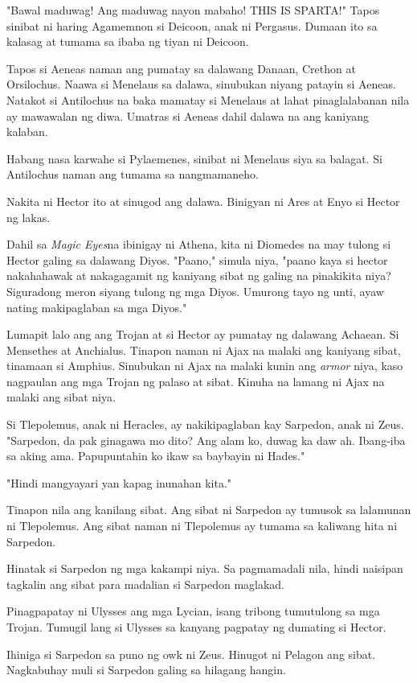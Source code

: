 \documentclass[12pt,letterpaper]{report}
\begin{document}
"Bawal maduwag! Ang maduwag nayon mabaho! THIS IS SPARTA!" Tapos sinibat ni haring Agamemnon si Deicoon, anak ni Pergasus. Dumaan ito sa kalasag at tumama sa ibaba ng tiyan ni Deicoon.

Tapos si Aeneas naman ang pumatay sa dalawang Danaan, Crethon at Orsilochus. Naawa si Menelaus sa dalawa, sinubukan niyang patayin si Aeneas. Natakot si Antilochus na baka mamatay si Menelaus at lahat pinaglalabanan nila ay mawawalan ng diwa. Umatras si Aeneas dahil dalawa na ang kaniyang kalaban.

Habang nasa karwahe si Pylaemenes, sinibat ni Menelaus siya sa balagat. Si Antilochus naman ang tumama sa nangmamaneho.

Nakita ni Hector ito at sinugod ang dalawa. Binigyan ni Ares at Enyo si Hector ng lakas.

Dahil sa \textit{Magic Eyes}\texttrademark na ibinigay ni Athena, kita ni Diomedes na may tulong si Hector galing sa dalawang Diyos. "Paano," simula niya, "paano kaya si hector nakahahawak at nakagagamit ng kaniyang sibat ng galing na pinakikita niya? Siguradong meron siyang tulong ng mga Diyos. Umurong tayo ng unti, ayaw nating makipaglaban sa mga Diyos."

Lumapit lalo ang ang Trojan at si Hector ay pumatay ng dalawang Achaean. Si Mensethes at Anchialus. Tinapon naman ni Ajax na malaki ang kaniyang sibat, tinamaan si Amphius. Sinubukan ni Ajax na malaki kunin ang \textit{armor} niya, kaso nagpaulan ang mga Trojan ng palaso at sibat. Kinuha na lamang ni Ajax na malaki ang sibat niya.

Si Tlepolemus, anak ni Heracles, ay nakikipaglaban kay Sarpedon, anak ni Zeus. "Sarpedon, da pak ginagawa mo dito? Ang alam ko, duwag ka daw ah. Ibang-iba sa aking ama. Papupuntahin ko ikaw sa baybayin ni Hades."

"Hindi mangyayari yan kapag inunahan kita."

Tinapon nila ang kanilang sibat. Ang sibat ni Sarpedon ay tumusok sa lalamunan ni Tlepolemus. Ang sibat naman ni Tlepolemus ay tumama sa kaliwang hita ni Sarpedon.

Hinatak si Sarpedon ng mga kakampi niya. Sa pagmamadali nila, hindi naisipan tagkalin ang sibat para madalian si Sarpedon maglakad.

Pinagpapatay ni Ulysses ang mga Lycian, isang tribong tumutulong sa mga Trojan. Tumugil lang si Ulysses sa kanyang pagpatay ng dumating si Hector.

Ihiniga si Sarpedon sa puno ng owk ni Zeus. Hinugot ni Pelagon ang sibat. Nagkabuhay muli si Sarpedon galing sa hilagang hangin.
\end{document}
